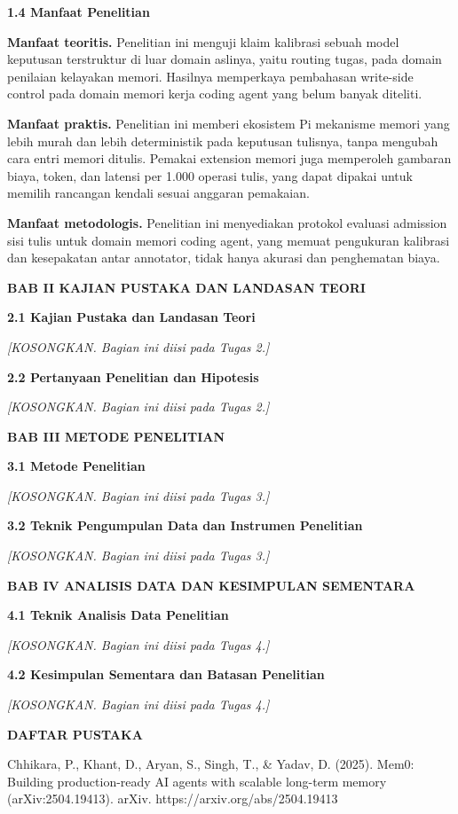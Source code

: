\documentclass[
]{article}
\begin{document}
\textbf{1.4 Manfaat Penelitian}

\textbf{Manfaat teoritis.} Penelitian ini menguji klaim kalibrasi sebuah
model keputusan terstruktur di luar domain aslinya, yaitu routing tugas,
pada domain penilaian kelayakan memori. Hasilnya memperkaya pembahasan
write-side control pada domain memori kerja coding agent yang belum
banyak diteliti.

\textbf{Manfaat praktis.} Penelitian ini memberi ekosistem Pi mekanisme
memori yang lebih murah dan lebih deterministik pada keputusan tulisnya,
tanpa mengubah cara entri memori ditulis. Pemakai extension memori juga
memperoleh gambaran biaya, token, dan latensi per 1.000 operasi tulis,
yang dapat dipakai untuk memilih rancangan kendali sesuai anggaran
pemakaian.

\textbf{Manfaat metodologis.} Penelitian ini menyediakan protokol
evaluasi admission sisi tulis untuk domain memori coding agent, yang
memuat pengukuran kalibrasi dan kesepakatan antar annotator, tidak hanya
akurasi dan penghematan biaya.

\textbf{BAB II KAJIAN PUSTAKA DAN LANDASAN TEORI}

\textbf{2.1 Kajian Pustaka dan Landasan Teori}

\emph{{[}KOSONGKAN. Bagian ini diisi pada Tugas 2.{]}}

\textbf{2.2 Pertanyaan Penelitian dan Hipotesis}

\emph{{[}KOSONGKAN. Bagian ini diisi pada Tugas 2.{]}}

\textbf{BAB III METODE PENELITIAN}

\textbf{3.1 Metode Penelitian}

\emph{{[}KOSONGKAN. Bagian ini diisi pada Tugas 3.{]}}

\textbf{3.2 Teknik Pengumpulan Data dan Instrumen Penelitian}

\emph{{[}KOSONGKAN. Bagian ini diisi pada Tugas 3.{]}}

\textbf{BAB IV ANALISIS DATA DAN KESIMPULAN SEMENTARA}

\textbf{4.1 Teknik Analisis Data Penelitian}

\emph{{[}KOSONGKAN. Bagian ini diisi pada Tugas 4.{]}}

\textbf{4.2 Kesimpulan Sementara dan Batasan Penelitian}

\emph{{[}KOSONGKAN. Bagian ini diisi pada Tugas 4.{]}}

\textbf{DAFTAR PUSTAKA}

Chhikara, P., Khant, D., Aryan, S., Singh, T., \& Yadav, D. (2025).
Mem0: Building production-ready AI agents with scalable long-term memory
(arXiv:2504.19413). arXiv. https://arxiv.org/abs/2504.19413
\end{document}
